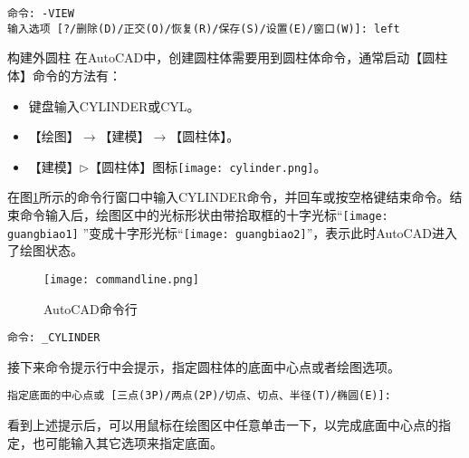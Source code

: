 \begin{procedure}
\begin{lstlisting}
命令: -VIEW
输入选项 [?/删除(D)/正交(O)/恢复(R)/保存(S)/设置(E)/窗口(W)]: left
\end{lstlisting}


\item 构建外圆柱
在AutoCAD中，创建圆柱体需要用到圆柱体命令，通常启动【圆柱体】命令的方法有：
\begin{itemize}
\item 键盘输入CYLINDER或CYL。
\item 【绘图】$\rightarrow$【建模】$\rightarrow$【圆柱体】。
\item 【建模】$\triangleright$【圆柱体】图标\texttt{[image: cylinder.png]}。
\end{itemize}
在图\ref{fig:commandline}所示的命令行窗口中输入CYLINDER命令，并回车或按空格键结束命令。结束命令输入后，绘图区中的光标形状由带拾取框的十字光标“\texttt{[image: guangbiao1]} ”变成十字形光标“\texttt{[image: guangbiao2]}”，表示此时AutoCAD进入了绘图状态。
\begin{figure}[htbp]
\centering
\texttt{[image: commandline.png]}
\caption{AutoCAD命令行}\label{fig:commandline}
\end{figure}

\begin{lstlisting}
命令: _CYLINDER
\end{lstlisting}
接下来命令提示行中会提示，指定圆柱体的底面中心点或者绘图选项。
\begin{lstlisting}
指定底面的中心点或 [三点(3P)/两点(2P)/切点、切点、半径(T)/椭圆(E)]:
\end{lstlisting}
看到上述提示后，可以用鼠标在绘图区中任意单击一下，以完成底面中心点的指定，也可能输入其它选项来指定底面。


\end{procedure}
